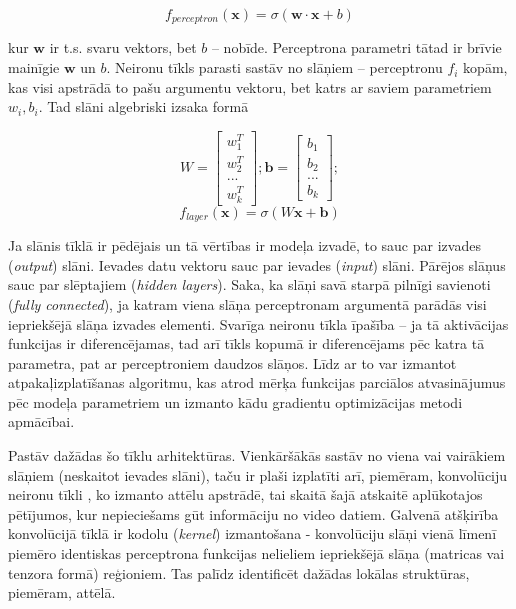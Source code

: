 \documentclass[12pt, a4paper]{article}
\numberwithin{equation}{section} %
\begin{document}
\begin{equation} 
    f_{perceptron}( \boldsymbol{x}) = \sigma( \boldsymbol{w} \cdot  \boldsymbol{x}+b)
\end{equation}

kur $ \boldsymbol{w}$ ir t.s. svaru vektors, bet $b$ --  nobīde. Perceptrona parametri tātad ir brīvie mainīgie $ \boldsymbol{w}$ un $b$. Neironu tīkls parasti sastāv no slāņiem -- perceptronu $f_i$ kopām, kas visi apstrādā to pašu argumentu vektoru, bet katrs ar saviem parametriem $w_i,b_i$. Tad slāni algebriski izsaka formā

\begin{equation} 
    W = \begin{bmatrix}
        w_1^T \\
        w_2^T \\
        ... \\
        w_k^T
    \end{bmatrix}; 
     \boldsymbol{b} =  \begin{bmatrix}
        b_1 \\
        b_2 \\
        ... \\
        b_k
    \end{bmatrix}; 
\end{equation}
\begin{equation} 
    f_{layer}( \boldsymbol{x}) = \sigma(W \boldsymbol{x}+ \boldsymbol{b})
\end{equation}

Ja slānis tīklā ir pēdējais un tā vērtības ir modeļa izvadē, to sauc par izvades (\textit{output}) slāni. Ievades datu vektoru sauc par ievades (\textit{input}) slāni. Pārējos slāņus sauc par slēptajiem (\textit{hidden layers}). Saka, ka slāņi savā starpā pilnīgi savienoti (\textit{fully connected}), ja katram viena slāņa perceptronam argumentā parādās visi iepriekšējā slāņa izvades elementi. Svarīga neironu tīkla īpašība -- ja tā aktivācijas funkcijas ir diferencējamas, tad arī tīkls kopumā ir diferencējams pēc katra tā parametra, pat ar perceptroniem daudzos slāņos. Līdz ar to var izmantot atpakaļizplatīšanas algoritmu, kas atrod mērķa funkcijas parciālos atvasinājumus pēc modeļa parametriem un izmanto kādu gradientu optimizācijas metodi apmācībai.

Pastāv dažādas šo tīklu arhitektūras. Vienkāršākās sastāv no viena vai vairākiem slāņiem (neskaitot ievades slāni), taču ir plaši izplatīti arī, piemēram, konvolūciju neironu tīkli \cite{krizhevsky2012imagenet}, ko izmanto attēlu apstrādē, tai skaitā šajā atskaitē aplūkotajos pētījumos, kur nepieciešams gūt informāciju no video datiem. Galvenā atšķirība konvolūcijā tīklā ir kodolu (\textit{kernel}) izmantošana - konvolūciju slāņi vienā līmenī piemēro identiskas perceptrona funkcijas nelieliem iepriekšējā slāņa (matricas vai tenzora formā) reģioniem. Tas palīdz identificēt dažādas lokālas struktūras, piemēram, attēlā. 
\end{document}
